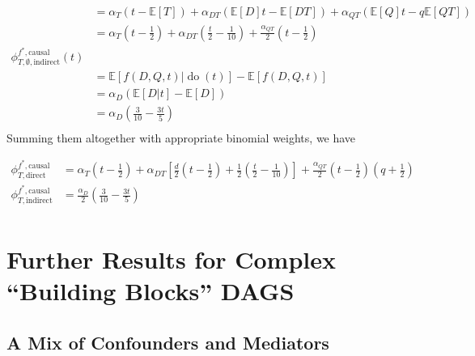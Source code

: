\documentclass{article}
\theoremstyle{plain}
\theoremstyle{definition}
\theoremstyle{remark}
\newcommand{\Do}{\operatorname{do}}
\newcommand{\effect}{\Psi}
\theoremstyle{mystyle}
\newtheorem{property}{Property}[section]
\newcommand{\coalitionshapley}[4]{\phi^{#1}_{#3,#2}(#4)}
\newcommand{\indep}{\perp\!\!\!\!\perp}
\begin{document}
\begin{align*}
    &= \alpha_T(t - \mathbb{E}[T]) + \alpha_{DT}(\mathbb{E}[D]t - \mathbb{E}[DT]) + \alpha_{QT}(\mathbb{E}[Q]t - q\mathbb{E}[QT]) \\
    &=  \alpha_T(t - \frac{1}{2}) + \alpha_{DT}(\frac{t}{2} - \frac{1}{10}) + \frac{\alpha_{QT}}{2} (t - \frac{1}{2}) \\
    \coalitionshapley{f^*,\text{causal}}{\emptyset,\text{indirect}}{T}{t} \\
    &=  \mathbb{E}[f(D,Q,t) | \Do(t)] - \mathbb{E}[f(D,Q,t)] \\
    &= \alpha_D (\mathbb{E}[D|t] - \mathbb{E}[D]) \\
    &= \alpha_D (\frac{3}{10} - \frac{3t}{5}) \\
\end{align*}
Summing them altogether with appropriate binomial weights, we have

\begin{align*}
    \phi^{f^*,\text{causal}}_{T,\text{direct}} &= \alpha_T(t - \frac{1}{2}) + \alpha_{DT}[\frac{d}{2}(t - \frac{1}{2}) + \frac{1}{2}(\frac{t}{2} - \frac{1}{10})] + \frac{\alpha_{QT}}{2}(t - \frac{1}{2})(q + \frac{1}{2}) \\
    \phi^{f^*,\text{causal}}_{T,\text{indirect}} &= \frac{\alpha_D}{2}  (\frac{3}{10} - \frac{3t}{5}) \\
\end{align*}


\section{Further Results for Complex ``Building Blocks'' DAGS} \label{sec:further_blocks}

\subsection{A Mix of Confounders and Mediators}

\end{document}
